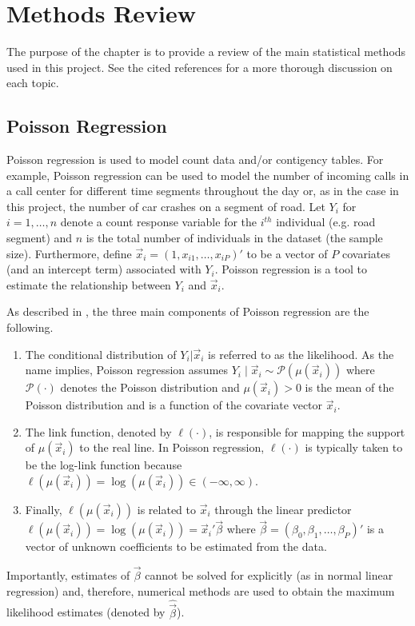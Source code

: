 \chapter{Methods Review}
The purpose of the chapter is to provide a review of the main statistical methods used in this project.  See the cited references for a more thorough discussion on each topic.

\section{Poisson Regression}

Poisson regression is used to model count data and/or contigency tables. For example, Poisson regression can be used to model the number of incoming calls in a call center for different time segments throughout the day or, as in the case in this project, the number of car crashes on a segment of road.  Let $Y_i$ for $i=1,\dots,n$ denote a count response variable for the $i^{th}$ individual (e.g. road segment) and $n$ is the total number of individuals in the dataset (the sample size).  Furthermore, define $\vec{x}_i = (1,x_{i1},\dots,x_{iP})'$ to be a vector of $P$ covariates (and an intercept term) associated with $Y_i$. Poisson regression is a tool to estimate the relationship between $Y_i$ and $\vec{x}_i$.

As described in \citet{weisberg05}, the three main components of Poisson regression are the following.
\begin{enumerate}
\item The conditional distribution of $Y_i | \vec{x}_i$ is referred to as the likelihood.  As the name implies, Poisson regression assumes $Y_i \mid \vec{x}_i \sim \mathcal{P}(\mu(\vec{x}_i))$ where $\mathcal{P}(\cdot)$ denotes the Poisson distribution and $\mu(\vec{x}_i) > 0$ is the mean of the Poisson distribution and is a function of the covariate vector $\vec{x}_i$.
\item The link function, denoted by $\ell(\cdot)$, is responsible for mapping the support of $\mu(\vec{x}_i)$ to the real line. In Poisson regression, $\ell(\cdot)$ is typically taken to be the log-link function because $\ell(\mu(\vec{x}_i)) = \log(\mu(\vec{x}_i)) \in (-\infty,\infty)$.
\item Finally, $\ell(\mu(\vec{x}_i))$ is related to $\vec{x}_i$ through the linear predictor $\ell(\mu(\vec{x}_i)) = \log(\mu(\vec{x}_i)) = \vec{x}_i' \vec{\beta}$ where $\vec{\beta} = (\beta_0,\beta_1,\dots,\beta_P)'$ is a vector of unknown coefficients to be estimated from the data.
\end{enumerate}
Importantly, estimates of $\vec{\beta}$ cannot be solved for explicitly (as in normal linear regression) and, therefore, numerical methods are used to obtain the maximum likelihood estimates (denoted by $\hat{\vec{\beta}}$).

